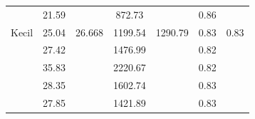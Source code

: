 \documentclass[conference]{IEEEtran}
\begin{document}
\begin{table}[]
\begin{tabular}{|l|cc|cc|cc|}
                                                      & \multicolumn{1}{c|}{\cellcolor[HTML]{FFFFFF}21.59} & \cellcolor[HTML]{FFFFFF}                         & \multicolumn{1}{c|}{\cellcolor[HTML]{FFFFFF}872.73}  & \cellcolor[HTML]{FFFFFF}                           & \multicolumn{1}{c|}{\cellcolor[HTML]{FFFFFF}0.86} & \cellcolor[HTML]{FFFFFF}                        \\ \cline{2-2} \cline{4-4} \cline{6-6}
  \multirow{-5}{*}{Kecil}                & \multicolumn{1}{c|}{\cellcolor[HTML]{FFFFFF}25.04} & \multirow{-5}{*}{\cellcolor[HTML]{FFFFFF}26.668} & \multicolumn{1}{c|}{\cellcolor[HTML]{FFFFFF}1199.54} & \multirow{-5}{*}{\cellcolor[HTML]{FFFFFF}1290.79} & \multicolumn{1}{c|}{\cellcolor[HTML]{FFFFFF}0.83} & \multirow{-5}{*}{\cellcolor[HTML]{FFFFFF}0.83} \\ \hline
                                                      & \multicolumn{1}{c|}{\cellcolor[HTML]{FFFFFF}27.42} & \cellcolor[HTML]{FFFFFF}                         & \multicolumn{1}{c|}{\cellcolor[HTML]{FFFFFF}1476.99} & \cellcolor[HTML]{FFFFFF}                           & \multicolumn{1}{c|}{\cellcolor[HTML]{FFFFFF}0.82} & \cellcolor[HTML]{FFFFFF}                        \\ \cline{2-2} \cline{4-4} \cline{6-6}
                                                      & \multicolumn{1}{c|}{\cellcolor[HTML]{FFFFFF}35.83} & \cellcolor[HTML]{FFFFFF}                         & \multicolumn{1}{c|}{\cellcolor[HTML]{FFFFFF}2220.67} & \cellcolor[HTML]{FFFFFF}                           & \multicolumn{1}{c|}{\cellcolor[HTML]{FFFFFF}0.82} & \cellcolor[HTML]{FFFFFF}                        \\ \cline{2-2} \cline{4-4} \cline{6-6}
                                                      & \multicolumn{1}{c|}{\cellcolor[HTML]{FFFFFF}28.35} & \cellcolor[HTML]{FFFFFF}                         & \multicolumn{1}{c|}{\cellcolor[HTML]{FFFFFF}1602.74} & \cellcolor[HTML]{FFFFFF}                           & \multicolumn{1}{c|}{\cellcolor[HTML]{FFFFFF}0.83} & \cellcolor[HTML]{FFFFFF}                        \\ \cline{2-2} \cline{4-4} \cline{6-6}
                                                      & \multicolumn{1}{c|}{\cellcolor[HTML]{FFFFFF}27.85} & \cellcolor[HTML]{FFFFFF}                         & \multicolumn{1}{c|}{\cellcolor[HTML]{FFFFFF}1421.89} & \cellcolor[HTML]{FFFFFF}                           & \multicolumn{1}{c|}{\cellcolor[HTML]{FFFFFF}0.83} & \cellcolor[HTML]{FFFFFF}                        \\ \cline{2-2} \cline{4-4} \cline{6-6}

\end{tabular}
\end{table}
\end{document}
